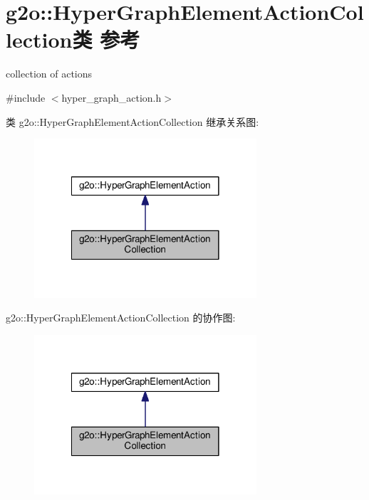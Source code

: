 \hypertarget{classg2o_1_1HyperGraphElementActionCollection}{\section{g2o\-:\-:Hyper\-Graph\-Element\-Action\-Collection类 参考}
\label{classg2o_1_1HyperGraphElementActionCollection}
}


collection of actions  




{\ttfamily \#include $<$hyper\-\_\-graph\-\_\-action.\-h$>$}



类 g2o\-:\-:Hyper\-Graph\-Element\-Action\-Collection 继承关系图\-:
\nopagebreak
\begin{figure}[H]
\begin{center}
\leavevmode
\includegraphics[width=234pt]{classg2o_1_1HyperGraphElementActionCollection__inherit__graph}
\end{center}
\end{figure}


g2o\-:\-:Hyper\-Graph\-Element\-Action\-Collection 的协作图\-:
\nopagebreak
\begin{figure}[H]
\begin{center}
\leavevmode
\includegraphics[width=234pt]{classg2o_1_1HyperGraphElementActionCollection__coll__graph}
\end{center}
\end{figure}
